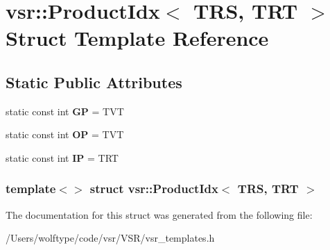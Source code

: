 \hypertarget{structvsr_1_1_product_idx_3_01_t_r_s_00_01_t_r_t_01_4}{\section{vsr\-:\-:Product\-Idx$<$ T\-R\-S, T\-R\-T $>$ Struct Template Reference}
\label{structvsr_1_1_product_idx_3_01_t_r_s_00_01_t_r_t_01_4}
}
\subsection*{Static Public Attributes}
\begin{DoxyCompactItemize}
\item 
\hypertarget{structvsr_1_1_product_idx_3_01_t_r_s_00_01_t_r_t_01_4_a5fcac069ca085c6b8cad767c66a0253f}{static const int {\bfseries G\-P} = T\-V\-T}\label{structvsr_1_1_product_idx_3_01_t_r_s_00_01_t_r_t_01_4_a5fcac069ca085c6b8cad767c66a0253f}

\item 
\hypertarget{structvsr_1_1_product_idx_3_01_t_r_s_00_01_t_r_t_01_4_ad70b78d10e2dc99985c1e86ed31124da}{static const int {\bfseries O\-P} = T\-V\-T}\label{structvsr_1_1_product_idx_3_01_t_r_s_00_01_t_r_t_01_4_ad70b78d10e2dc99985c1e86ed31124da}

\item 
\hypertarget{structvsr_1_1_product_idx_3_01_t_r_s_00_01_t_r_t_01_4_a644e37c311d6c09d4a2f13457a13859a}{static const int {\bfseries I\-P} = T\-R\-T}\label{structvsr_1_1_product_idx_3_01_t_r_s_00_01_t_r_t_01_4_a644e37c311d6c09d4a2f13457a13859a}

\end{DoxyCompactItemize}
\subsubsection*{template$<$$>$ struct vsr\-::\-Product\-Idx$<$ T\-R\-S, T\-R\-T $>$}



The documentation for this struct was generated from the following file\-:\begin{DoxyCompactItemize}
\item 
/\-Users/wolftype/code/vsr/\-V\-S\-R/vsr\-\_\-templates.\-h\end{DoxyCompactItemize}
